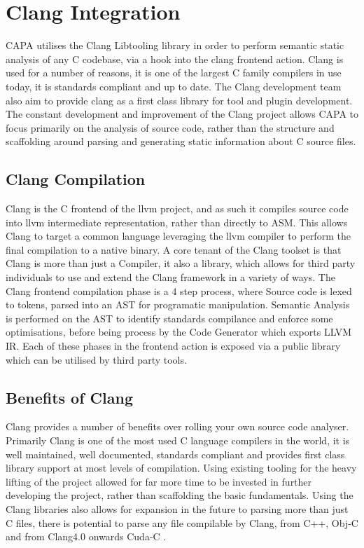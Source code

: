 
\section{Clang Integration} %
CAPA utilises the Clang Libtooling library in order to perform semantic static analysis of any C
codebase, via a hook into the clang frontend action. Clang is used for a number of reasons, it is
one of the largest C family compilers in use today, it is standards compliant and up to date. The
Clang development team also aim to provide clang as a first class library for tool and plugin
development. The constant development and improvement of the Clang project allows CAPA to focus
primarily on the analysis of source code, rather than the structure and scaffolding around parsing
and generating static information about C source files.

\subsection{Clang Compilation}
Clang is the C frontend of the llvm project, and as such it compiles source code into llvm
intermediate representation, rather than directly to ASM. This allows Clang to target a common
language leveraging the llvm compiler to perform the final compilation to a native binary. A core
tenant of the Clang toolset is that Clang is more than just a Compiler, it also a library, which
allows for third party individuals to use and extend the Clang framework in a variety of ways.
\cite{clangFeatures}
The Clang frontend compilation phase is a 4 step process, where Source code is lexed to tokens,
parsed into an AST for programatic manipulation. Semantic Analysis is performed on the AST to
identify standards compilance and enforce some optimisations, before being process by the Code
Generator which exports LLVM IR. Each of these phases in the frontend action is exposed via a public
library which can be utilised by third party tools.

\subsection{Benefits of Clang}
Clang provides a number of benefits over rolling your own source code analyser. Primarily Clang is
one of the most used C language compilers in the world, it is well maintained, well documented,
standards compliant and provides first class library support at most levels of compilation. Using
existing tooling for the heavy lifting of the project allowed for far more time to be invested in
further developing the project, rather than scaffolding the basic fundamentals. Using the Clang
libraries also allows for expansion in the future to parsing more than just C files, there is
potential to parse any file compilable by Clang, from C++, Obj-C and from Clang4.0 onwards Cuda-C
\cite{clangFeatures}.

